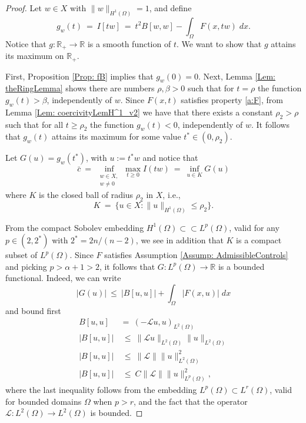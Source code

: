 \documentclass[11pt]{amsart}   	%
\theoremstyle{plain}
\numberwithin{equation}{section}
\def\Om{\Omega}
\def\R{\mathbb{R}}
\begin{document}
\begin{proof}
Let $w \in X$ with $\|w \|_{H^1(\Omega)} =1$, and define
\[ g_w(t) \ = \ I[tw] \ = \ t^2 B[w,w] - \int_\Omega F(x,tw) \;dx.\]
Notice that $g: \R_+ \to \R$ is a smooth function of $t$. 
We want to show that $g$ attains its maximum on $\R_+$.

First, Proposition \ref{Prop: fB} implies that $g_w(0) =0$. Next, Lemma \ref{Lem: theRingLemma} shows there are numbers $\rho,\beta >0$ such that for $t= \rho$ the function $g_w(t) >\beta$, independently of $w$.
Since $F(x,t)$ satisfies property \ref{a:F}, from Lemma \ref{Lem: coercivityLemH^1_v2} we have that there exists a constant $\rho_2> \rho$ such that for all $t\geq \rho_2$ the function $g_w(t) <0$, independently of $w$. It follows that $g_w(t)$ attains its maximum for some value $t^* \in (0, \rho_2)$.


Let $G(u) = g_w(t^*)$, with $u := t^* w$ and notice that
\[ \bar{c} \ = \ \inf_{\substack{w \in X,\\ w\neq 0}} \max_{t\geq 0} I(tw) \ = \ \inf_{u \in K } G(u)\]
where $K$ is the closed ball of radius $\rho_2$ in $X$, i.e.,
\[ K \ = \ \{ u \in X: \| u\|_{H^1(\Omega)} \leq \rho_2\}.\]


{
From the compact Sobolev embedding $H^1(\Omega) \subset \subset L^p(\Omega)$, valid for any $p \in (2, 2^*)$ with $2^* =  2n/(n-2)$, we see in addition that $K$ is a compact subset of $L^p(\Omega)$. Since $F$ satisfies Assumption \ref{Assump: AdmissibleControls} and picking $ p>\alpha +1>2$, it follows that $G: L^p(\Omega) \longrightarrow \R$ is a bounded functional. Indeed, we can write
\[ |G(u)| \ \leq \ |B[u,u] | +  \int_\Omega \left| F(x,u) \right| \;dx\]
and bound first
\begin{align*}
B[u,u] \ & = \ (- \mathcal{L} u, u)_{L^2(\Omega)} \\
| B[u,u] | & \ \leq \ \|\mathcal{L}u \|_{L^2(\Om)} \| u\|_{L^2(\Omega)} \\
| B[u,u] | & \ \leq \ \|\mathcal{L}\| \|u \|^2_{L^2(\Om)} \\
| B[u,u] | & \ \leq \ C \|\mathcal{L}\| \|u \|^2_{L^p(\Om)},
\end{align*}
where the last inequality follows from the embedding $L^p(\Omega) \subset L^r(\Omega)$, valid for bounded domains $\Omega$ when $p>r$, and the fact that the operator $\mathcal{L}:L^2(\Omega) \longrightarrow L^2(\Omega)$ is bounded.

}
\end{proof}
\end{document}
